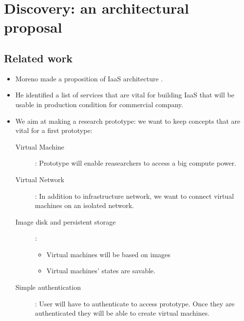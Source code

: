 \section{Discovery: an architectural proposal}
\label{sec:architecture}

\subsection{Related work}

\begin{itemize}

	\item Moreno made a proposition of IaaS architecture \cite{moreno2012iaas}.	
	
	\item He identified a list of services that are vital for building IaaS that will be usable in production condition for commercial company.

	\item We aim at making a research prototype: we want to keep concepts that are vital for a first prototype:

		\begin{description}

			\item [Virtual Machine] : Prototype will enable reasearchers to access a big compute power.

			\item [Virtual Network] : In addition to infrastructure network, we want to connect virtual machines on an isolated network.

			\item [Image disk and persistent storage] : 
				\begin{itemize}

					\item Virtual machines will be based on images

					\item Virtual machines' states are savable.
				
				\end{itemize}

			\item [Simple authentication] : User will have to authenticate to access prototype. Once they are authenticated they will be able to create virtual machines.

		\end{description}

\end{itemize}

